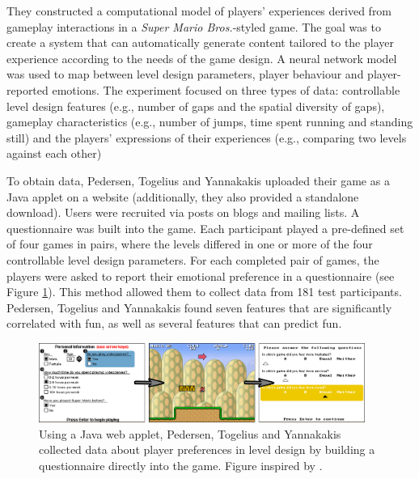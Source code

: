 They constructed a computational model of players' experiences derived from gameplay interactions in a \textit{Super Mario Bros.}-styled game. The goal was to create a system that can automatically generate content tailored to the player experience according to the needs of the game design. A neural network model was used to map between level design parameters, player behaviour and player-reported emotions. The experiment focused on three types of data: controllable level design features (e.g., number of gaps and the spatial diversity of gaps), gameplay characteristics (e.g., number of jumps, time spent running and standing still) and the players' expressions of their experiences (e.g., comparing two levels against each other)

To obtain data, Pedersen, Togelius and Yannakakis uploaded their game as a Java applet on a website (additionally, they also provided a standalone download). Users were recruited via posts on blogs and mailing lists. A questionnaire was built into the game. Each participant played a pre-defined set of four games in pairs, where the levels differed in one or more of the four controllable level design parameters. For each completed pair of games, the players were asked to report their emotional preference in a questionnaire (see Figure \ref{fig:mario}). This method allowed them to collect data from 181 test participants. Pedersen, Togelius and Yannakakis found seven features that are significantly correlated with fun, as well as several features that can predict fun.


\begin{figure}[htbp]
\centering
\includegraphics[width=0.95\textwidth]{Pics/mario_all2}
\caption{Using a Java web applet, Pedersen, Togelius and Yannakakis collected data about player preferences in level design by building a questionnaire directly into the game. Figure inspired by \cite{marioModel}.}
\label{fig:mario}
\end{figure}